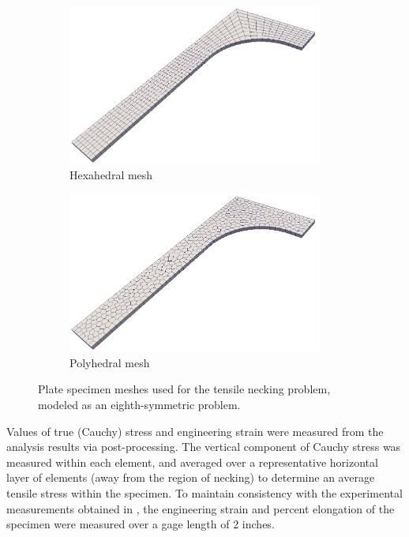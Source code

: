 \begin{figure}[!h]
  \centering
    \begin{subfigure}[b]{0.49\linewidth}
            \centering
            \includegraphics[width=3.3in]{figures/necking_hex_mesh.pdf}
    			\caption{Hexahedral mesh \label{fig:necking_hex_mesh}}
    \end{subfigure}
	\begin{subfigure}[b]{0.49\linewidth}
            \centering
            \includegraphics[width=3.3in]{figures/necking_poly_mesh.pdf}
    			\caption{Polyhedral mesh \label{fig:necking_poly_mesh}}
    \end{subfigure} \caption{Plate specimen meshes used for the tensile necking problem, modeled as an eighth-symmetric problem.}
  \label{fig:necking_meshes}
\end{figure}

Values of true (Cauchy) stress and engineering strain were measured from the analysis results via post-processing. The vertical component of Cauchy stress was measured within each element, and averaged over a representative horizontal layer of elements (away from the region of necking) to determine an average tensile stress within the specimen. To maintain consistency with the experimental measurements obtained in \cite{Gerberich:62}, the engineering strain and percent elongation of the specimen were measured over a gage length of 2 inches.

